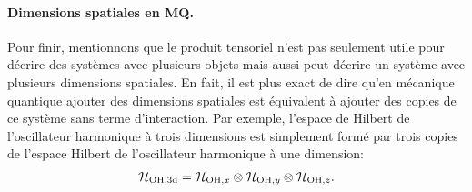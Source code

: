 \documentclass[11pt,a4paper,oneside]{article}
\begin{document}
\paragraph*{Dimensions spatiales en MQ.} Pour finir, mentionnons que le produit tensoriel n'est pas seulement utile pour décrire des systèmes avec plusieurs objets mais aussi peut décrire un système avec plusieurs dimensions spatiales. En fait, il est plus exact de dire qu'en mécanique quantique ajouter des dimensions spatiales est équivalent à ajouter des copies de ce système sans terme d'interaction. Par exemple, l'espace de Hilbert de l'oscillateur harmonique à trois dimensions est simplement formé par trois copies de l'espace Hilbert de l'oscillateur harmonique à une dimension:
\begin{eqnarray}
    \mathcal{H}_{\text{OH,3d}}=\mathcal{H}_{\text{OH},x}\otimes\mathcal{H}_{\text{OH},y}\otimes\mathcal{H}_{\text{OH},z}.
\end{eqnarray}
\end{document}
